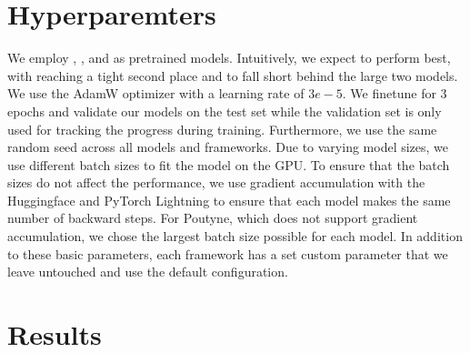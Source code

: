 \documentclass[letterpaper,10pt,english]{jupyterBook}
\begin{document}
\section{Hyperparemters}
\label{\detokenize{ExperimentalResults:hyperparemters}}
\sphinxAtStartPar
We employ , , and  as pretrained models.
Intuitively, we expect  to perform best, with  reaching a tight second place and  to fall short behind the large two models.
We use the AdamW optimizer with a learning rate of \(3e-5\). We finetune for \(3\) epochs and validate our models on the test set while the validation set is only used for tracking the progress during training.
Furthermore, we use the same random seed across all models and frameworks. Due to varying model sizes, we use different batch sizes to fit the model on the GPU. To ensure that the batch sizes do not affect the performance, we use gradient accumulation with the Huggingface  and PyTorch Lightning to ensure that each model makes the same number of backward steps. For Poutyne, which does not support gradient accumulation, we chose the largest batch size possible for each model.
In addition to these basic parameters, each framework has a set custom parameter that we leave untouched and use the default configuration.


\section{Results}
\label{\detokenize{ExperimentalResults:results}}
\end{document}
